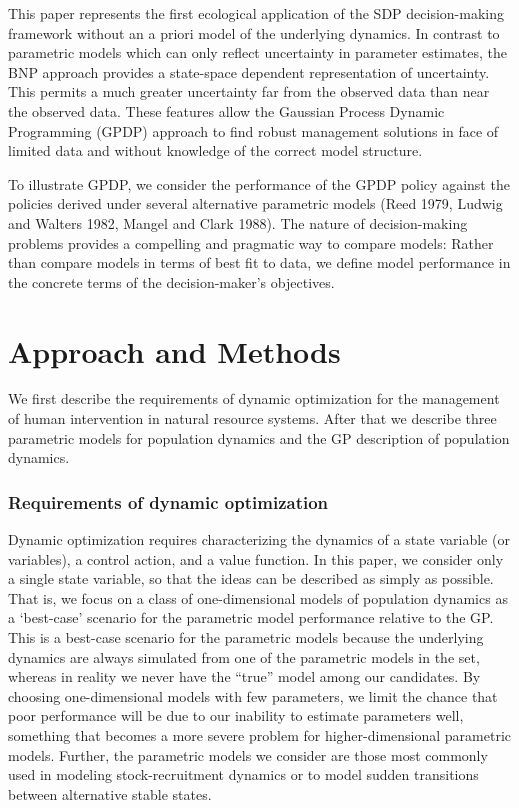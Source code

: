 \documentclass[author-year, 12pt,review]{components/elsarticle} %
\begin{document}
This paper represents the first ecological application of the SDP
decision-making framework without an a priori model of the underlying
dynamics. In contrast to parametric models which can only reflect
uncertainty in parameter estimates, the BNP approach provides a
state-space dependent representation of uncertainty. This permits a much
greater uncertainty far from the observed data than near the observed
data. These features allow the Gaussian Process Dynamic Programming
(GPDP) approach to find robust management solutions in face of limited
data and without knowledge of the correct model structure.

To illustrate GPDP, we consider the performance of the GPDP policy
against the policies derived under several alternative parametric models
(Reed 1979, Ludwig and Walters 1982, Mangel and Clark 1988). The nature
of decision-making problems provides a compelling and pragmatic way to
compare models: Rather than compare models in terms of best fit to data,
we define model performance in the concrete terms of the
decision-maker's objectives.

\section{Approach and Methods}\label{approach-and-methods}

We first describe the requirements of dynamic optimization for the
management of human intervention in natural resource systems. After that
we describe three parametric models for population dynamics and the GP
description of population dynamics.

\subsubsection{Requirements of dynamic
optimization}\label{requirements-of-dynamic-optimization}

Dynamic optimization requires characterizing the dynamics of a state
variable (or variables), a control action, and a value function. In this
paper, we consider only a single state variable, so that the ideas can
be described as simply as possible. That is, we focus on a class of
one-dimensional models of population dynamics as a `best-case' scenario
for the parametric model performance relative to the GP. This is a
best-case scenario for the parametric models because the underlying
dynamics are always simulated from one of the parametric models in the
set, whereas in reality we never have the ``true'' model among our
candidates. By choosing one-dimensional models with few parameters, we
limit the chance that poor performance will be due to our inability to
estimate parameters well, something that becomes a more severe problem
for higher-dimensional parametric models. Further, the parametric models
we consider are those most commonly used in modeling stock-recruitment
dynamics or to model sudden transitions between alternative stable
states.
\end{document}
